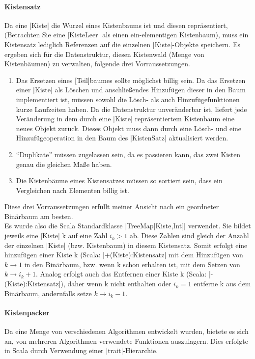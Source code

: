 \paragraph{Kistensatz}
Da eine |Kiste| die Wurzel eines Kistenbaums ist und diesen repräsentiert, (Betrachten Sie eine |KisteLeer| als einen ein-elementigen Kistenbaum),
  muss ein Kistensatz lediglich Referenzen auf die einzelnen |Kiste|-Objekte speichern.
Es ergeben sich für die Datenstruktur, diesen Kistenwald (Menge von Kistenbäumen) zu verwalten, folgende drei Vorraussetzungen. 
\begin{enumerate}
 \item Das Ersetzen eines [Teil]baumes sollte möglichst billig sein.
Da das Ersetzen einer |Kiste| als Löschen und anschließendes Hinzufügen dieser in den Baum implementiert ist,
  müssen sowohl die Lösch- als auch Hinzufügefunktionen kurze Laufzeiten haben.
Da die Datenstruktur unveränderbar ist, liefert jede Veränderung in dem durch eine |Kiste| repräsentiertem Kistenbaum eine neues Objekt zurück.
Dieses Objekt muss dann durch eine Lösch- und eine Hinzufügeoperation in den Baum des |KistenSatz| aktualisiert werden.
 \item ``Duplikate'' müssen zugelassen sein, da es passieren kann, das zwei Kisten genau die gleichen Maße haben.
 \item Die Kistenbäume eines Kistensatzes müssen so sortiert sein, dass ein Vergleichen nach Elementen billig ist.
\end{enumerate}
Diese drei Vorraussetzungen erfüllt meiner Ansicht nach ein geordneter Binärbaum am besten. \\ %
Es wurde also die Scala Standardklasse |TreeMap[Kiste,Int]| verwendet. Sie bildet jeweils eine |Kiste| k auf eine Zahl $i_k > 1$ ab.
Diese Zahlen sind gleich der Anzahl der einzelnen |Kiste| (bzw. Kistenbaum) in diesem Kistensatz.
Somit erfolgt eine hinzufügen einer Kiste k (Scala: |+(Kiste):Kistensatz| mit dem Hinzufügen von $k \rightarrow 1$ in den Binärbaum,
  bzw. wenn k schon erhalten ist, mit dem Setzen von $k \rightarrow i_k + 1$.
Analog erfolgt auch das Entfernen einer Kiste k (Scala: |-(Kiste):Kistensatz|),
  daher wenn k nicht enthalten oder $i_k = 1$ entferne k aus dem Binärbaum, andernfalls setze $k \rightarrow i_k - 1$.

\paragraph{Kistenpacker}
Da eine Menge von verschiedenen Algorithmen entwickelt wurden, bietete es sich an, von mehreren Algorithmen verwendete Funktionen auszulagern.
Dies erfolgte in Scala durch Verwendung einer |trait|-Hierarchie. %
